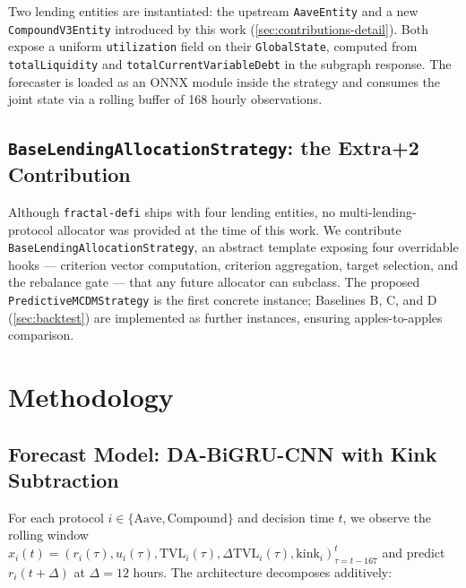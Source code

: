 \documentclass[11pt,a4paper]{article}
\begin{document}
Two lending entities are instantiated: the upstream \texttt{AaveEntity}
and a new \texttt{CompoundV3Entity} introduced by this work
(\cref{sec:contributions-detail}). Both expose a uniform
\texttt{utilization} field on their \texttt{GlobalState}, computed
from \texttt{totalLiquidity} and \texttt{totalCurrentVariableDebt}
in the subgraph response. The forecaster is loaded as an ONNX module
inside the strategy and consumes the joint state via a rolling
buffer of 168 hourly observations.

\subsection{\texttt{BaseLendingAllocationStrategy}: the Extra+2 Contribution}
\label{sec:basealloc}

Although \texttt{fractal-defi} ships with four lending entities, no
multi-lending-protocol allocator was provided at the time of this work.
We contribute \texttt{BaseLendingAllocationStrategy}, an abstract
template exposing four overridable hooks --- criterion vector
computation, criterion aggregation, target selection, and the
rebalance gate --- that any future allocator can subclass. The
proposed \texttt{PredictiveMCDMStrategy} is the first concrete
instance; Baselines B, C, and D (\cref{sec:backtest}) are
implemented as further instances, ensuring apples-to-apples
comparison.

\section{Methodology}
\label{sec:methodology}

\subsection{Forecast Model: DA-BiGRU-CNN with Kink Subtraction}
\label{sec:dual-branch}

For each protocol $i\in\{\text{Aave},\text{Compound}\}$ and decision
time $t$, we observe the rolling window
$x_i(t)=(r_i(\tau),u_i(\tau),\text{TVL}_i(\tau),\Delta\text{TVL}_i(\tau),
\text{kink}_i)_{\tau=t-167}^{t}$ and predict $r_i(t+\Delta)$ at
$\Delta=12$ hours. The architecture decomposes additively:
\end{document}
